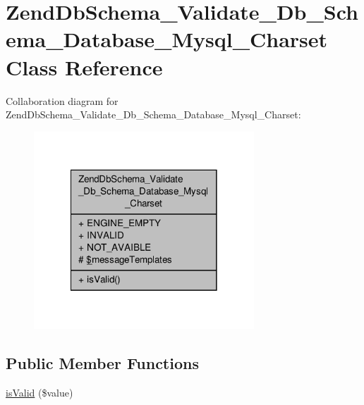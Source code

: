 \hypertarget{classZendDbSchema__Validate__Db__Schema__Database__Mysql__Charset}{\section{Zend\-Db\-Schema\-\_\-\-Validate\-\_\-\-Db\-\_\-\-Schema\-\_\-\-Database\-\_\-\-Mysql\-\_\-\-Charset Class Reference}
\label{classZendDbSchema__Validate__Db__Schema__Database__Mysql__Charset}
}


Collaboration diagram for Zend\-Db\-Schema\-\_\-\-Validate\-\_\-\-Db\-\_\-\-Schema\-\_\-\-Database\-\_\-\-Mysql\-\_\-\-Charset\-:\nopagebreak
\begin{figure}[H]
\begin{center}
\leavevmode
\includegraphics[width=234pt]{classZendDbSchema__Validate__Db__Schema__Database__Mysql__Charset__coll__graph}
\end{center}
\end{figure}
\subsection*{Public Member Functions}
\begin{DoxyCompactItemize}
\item 
\hyperlink{classZendDbSchema__Validate__Db__Schema__Database__Mysql__Charset_aa2c230a41be9af7501a3efbaedec4f52}{is\-Valid} (\$value)
\end{DoxyCompactItemize}

